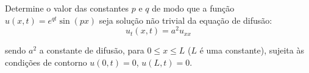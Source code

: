 \linespread{1.5}
Determine o valor das constantes $p$ e $q$ de modo que a função $u(x,t) = e^{qt}\sin{(px)}$ seja solução não trivial da equação de difusão:
\begin{equation*}
    u_t(x,t) = a^2u_{xx}
\end{equation*}

sendo $a^2$ a constante de difusão, para $0 \leq x \leq L$ ($L$ é uma constante), sujeita às condições de contorno $u(0,t) = 0$, $u(L,t) = 0$.